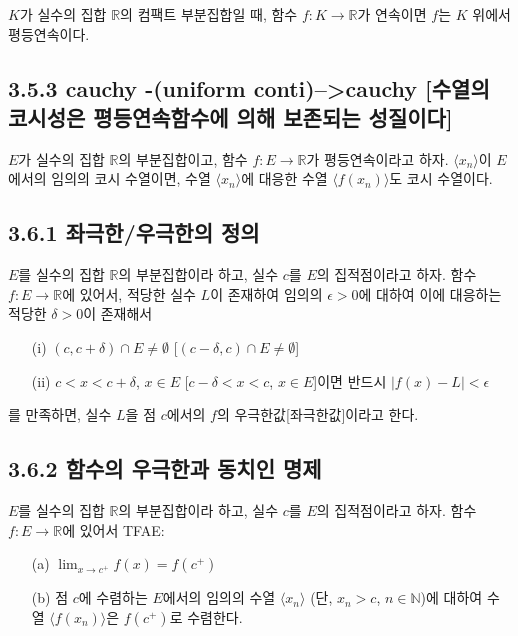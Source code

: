 \documentclass{article}
\begin{document}
$K$가 실수의 집합 $\mathbb{R}$의 컴팩트 부분집합일 때, 함수 $f: K \to \mathbb{R}$가 연속이면 $f$는 $K$ 위에서 평등연속이다.

\subsection*{\textmd{3.5.3 cauchy -(uniform conti)--\textgreater cauchy [수열의 코시성은 평등연속함수에 의해 보존되는 성질이다]}}

$E$가 실수의 집합 $\mathbb{R}$의 부분집합이고, 함수 $f: E \to \mathbb{R}$가 평등연속이라고 하자. $\langle x_n \rangle$이 $E$에서의 임의의 코시 수열이면,
수열 $\langle x_n \rangle$에 대응한 수열 $\langle f(x_n) \rangle$도 코시 수열이다.

\subsection{\fontsize{11.5}{13}\selectfont{구간 위에서 정의된 단조함수의 불연속점들의 집합은 가산임을 보인다.}}


\subsection*{\textmd{3.6.1 좌극한/우극한의 정의}}

$E$를 실수의 집합 $\mathbb{R}$의 부분집합이라 하고, 실수 $c$를 $E$의 집적점이라고 하자.
함수 $f: E \to \mathbb{R}$에 있어서, 적당한 실수 $L$이 존재하여 
임의의 $\epsilon > 0$에 대하여 이에 대응하는 적당한 $\delta > 0$이 존재해서
\begin{itemize}
    \item[(i)] $(c, c + \delta) \cap E \neq \emptyset$ [$(c - \delta, c) \cap E \neq \emptyset$]
    \item[(ii)] $c < x < c + \delta$, $x \in E$ [$c - \delta < x < c$, $x \in E$]이면 반드시 $\left| f(x) - L \right| < \epsilon$
\end{itemize}
를 만족하면, 실수 $L$을 점 $c$에서의 $f$의 우극한값[좌극한값]이라고 한다.

\subsection*{\textmd{3.6.2 함수의 우극한과 동치인 명제}}

$E$를 실수의 집합 $\mathbb{R}$의 부분집합이라 하고, 실수 $c$를 $E$의 집적점이라고 하자.
함수 $f: E \to \mathbb{R}$에 있어서 TFAE:
\begin{itemize}
    \item[(a)] $\lim_{x \to c^+} f(x) = f(c^+)$
    \item[(b)] 점 $c$에 수렴하는 $E$에서의 임의의 수열 $\langle x_n \rangle$ (단, $x_n > c$, $n \in \mathbb{N}$)에 대하여
    수열 $\langle f(x_n) \rangle$은 $f(c^+)$로 수렴한다.
\end{itemize}
\end{document}

